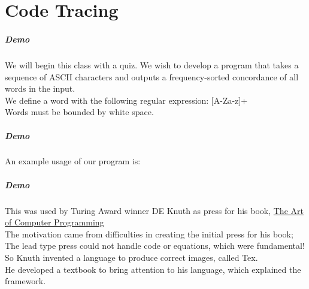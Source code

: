 \part{Code Tracing}
\frame{\partpage}

\begin{frame}
\frametitle{Demo}
\noindent We will begin this class with a quiz.  
We wish to develop a program that takes a sequence of ASCII characters 
	and outputs a frequency-sorted concordance of all words in the input.\\
We define a word with the following regular expression: [A-Za-z]+ \\
Words must be bounded by white space.
\end{frame}

\begin{frame}
\frametitle{Demo}
An example usage of our program is:
\begin{center}\end{center}
\end{frame}

\begin{frame}
\frametitle{Demo}
\noindent This was used by Turing Award winner DE Knuth as press for his book, 
	\underline{The Art of Computer Programming} \\
The motivation came from difficulties in creating the initial press for his book;\\
	\indent The lead type press could not handle code or equations, which were fundamental! \\
So Knuth invented a language to produce correct images, called Tex. \\
He developed a textbook to bring attention to his language, which explained the framework.
\end{frame}

